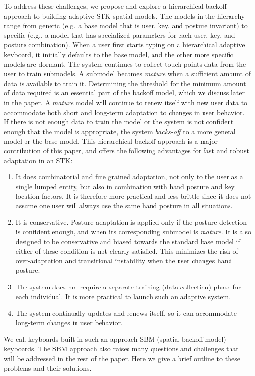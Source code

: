 \documentclass{sigchi}
\begin{document}
To address these challenges, we propose and explore a hierarchical backoff approach to building adaptive STK spatial models. The models in the hierarchy range from generic (e.g.\ a base model that is user, key, and posture invariant) to specific (e.g., a model that has specialized parameters for each user, key, and posture combination). When a user first starts typing on a hierarchical adaptive keyboard, it initially defaults to the base model, and the other more specific models are dormant. The system continues to collect touch points data from the user to train submodels. A submodel becomes \textit{mature} when a sufficient amount of data is available to train it. Determining the threshold for the minimum amount of data required is an essential part of the backoff model, which we discuss later in the paper.
A \textit{mature} model will continue to renew itself with new user data to accommodate  both short and long-term adaptation to changes in user behavior. If there is not enough data to train the model or the system is not confident enough that the model is appropriate, the system \textit{backs-off} to a more general model or the base model. This hierarchical backoff approach is a major contribution of this paper, and offers the following advantages for fast and robust adaptation in an STK:
\begin{enumerate}
\item It does combinatorial and fine grained adaptation, not only to the user as a single lumped entity, but also in combination with hand posture and key location factors. It is therefore more practical and less brittle since it does not assume one user will always use the same hand posture in all situations.

\item It is conservative. Posture adaptation is applied only if the posture detection is confident enough, and when its corresponding submodel is \textit{mature}. It is also designed to be conservative and biased towards the standard base model if either of these condition is not clearly satisfied. This minimizes the risk of over-adaptation and transitional instability when the user changes hand posture. 
 
\item The system does not require a separate training (data collection) phase for each individual. It is more practical to launch such an adaptive system.

\item The system continually updates and renews itself, so it can accommodate
long-term changes in user behavior.
\end{enumerate}
We call keyboards built in such an approach SBM (spatial backoff model)
keyboards. The SBM approach also raises many questions and challenges that will
be addressed in the rest of the paper. Here we give a brief outline to these problems and their solutions.
\end{document}
